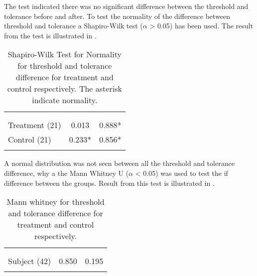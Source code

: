 The test indicated there was no significant difference between the threshold and tolerance before and after. To test the normality of the difference between threshold and tolerance a Shapiro-Wilk test ($\alpha$ > 0.05) has been used. The result from the test is illustrated in .

\begin{longtable} {l|c|c}
 \rowcolor[HTML]{C0C0C0} 
  \color[HTML]{000000}{} & 
 \multicolumn{1}{c|}{ \color[HTML]{000000}{\textbf{Threshold}}} & \multicolumn{1}{c}{ \color[HTML]{000000}{\textbf{Tolerance}}}  	\\  \rule{0pt}{3ex} 
  \cellcolor[HTML]{C0C0C0}{} &
 \multicolumn{1}{c|}{ \cellcolor[HTML]{C0C0C0}{Difference }} & \multicolumn{1}{|c}{ \cellcolor[HTML]{C0C0C0}{Difference}}  	\\ \hline
Treatment (21) & 0.013 &  0.888* \\ \hline
Control (21) & 0.233*  & 0.856*  \\ \hline
	\caption{Shapiro-Wilk Test for Normality for threshold and tolerance difference for treatment and control respectively. The asterisk indicate normality.}
	\label{tab:ShapiroWilk2}
\end{longtable}
\vspace{-.5cm}

A normal distribution was not seen between all the threshold and tolerance difference, why a the Mann Whitney U ($\alpha$ < 0.05) was used to test the if difference between the groups. Result from this test is illustrated in .

\begin{longtable} {l|c|c}
 \rowcolor[HTML]{C0C0C0} 
  \color[HTML]{000000}{} & 
 \multicolumn{1}{c|}{ \color[HTML]{000000}{\textbf{Threshold}}} & \multicolumn{1}{c}{ \color[HTML]{000000}{\textbf{Tolerance}}}  	\\  \rule{0pt}{3ex} 
  \cellcolor[HTML]{C0C0C0}{} &
 \multicolumn{1}{c|}{ \cellcolor[HTML]{C0C0C0}{Difference }} & \multicolumn{1}{|c}{ \cellcolor[HTML]{C0C0C0}{Difference}}  	\\ \hline
Subject (42) & 0.850 & 0.195 \\ \hline
	\caption{Mann whitney for threshold and tolerance difference for treatment and control respectively.}	\label{tab:MannWhitney1}
\end{longtable}
\vspace{-.5cm}


